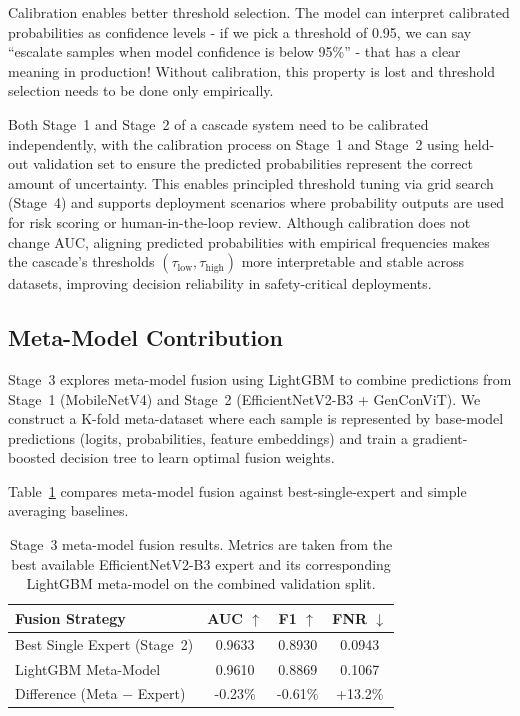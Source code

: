 Calibration enables better threshold selection. The model can interpret calibrated probabilities as confidence levels \hyp{} if we pick a threshold of 0.95, we can say ``escalate samples when model confidence is below 95\%'' \hyp{} that has a clear meaning in production! Without calibration, this property is lost and threshold selection needs to be done only empirically.

Both Stage~1 and Stage~2 of a cascade system need to be calibrated independently, with the calibration process on Stage~1 and Stage~2 using held\hyp out validation set to ensure the predicted probabilities represent the correct amount of uncertainty. This enables principled threshold tuning via grid search (Stage~4) and supports deployment scenarios where probability outputs are used for risk scoring or human\hyp in\hyp the\hyp loop review. Although calibration does not change AUC, aligning predicted probabilities with empirical frequencies makes the cascade's thresholds $(\tau_{\mathrm{low}},\tau_{\mathrm{high}})$ more interpretable and stable across datasets, improving decision reliability in safety\hyp critical deployments.

\subsection{Meta-Model Contribution}

Stage~3 explores meta\hyp model fusion using LightGBM to combine predictions from Stage~1 (MobileNetV4) and Stage~2 (EfficientNetV2\hyp B3 + GenConViT). We construct a K\hyp fold meta\hyp dataset where each sample is represented by base\hyp model predictions (logits, probabilities, feature embeddings) and train a gradient\hyp boosted decision tree to learn optimal fusion weights.

Table~\ref{tab:ablation_metamodel} compares meta\hyp model fusion against best\hyp single\hyp expert and simple averaging baselines.

\begin{table}[h]
\centering
\caption{Stage~3 meta\hyp model fusion results. Metrics are taken from the best available EfficientNetV2\hyp B3 expert and its corresponding LightGBM meta\hyp model on the combined validation split.}
\label{tab:ablation_metamodel}
\begin{tabular}{@{}lccc@{}}
\toprule
Fusion Strategy & AUC $\uparrow$ & F1 $\uparrow$ & FNR $\downarrow$ \\
\midrule
Best Single Expert (Stage~2) & 0.9633 & 0.8930 & 0.0943 \\
LightGBM Meta\hyp Model      & 0.9610 & 0.8869 & 0.1067 \\
\midrule
Difference (Meta $-$ Expert) & -0.23\% & -0.61\% & +13.2\% \\
\bottomrule
\end{tabular}
\end{table}

